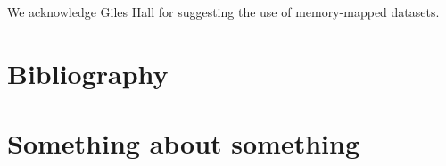 \documentclass[times, twoside, watermark]{StyleBioRxiv}
\begin{document}
\begin{acknowledgements}
We acknowledge Giles Hall for suggesting the use of memory-mapped datasets.
\end{acknowledgements}

\section*{Bibliography}




\captionsetup*{format=largeformat}
\section{Something about something} \label{note:Note1} 

\end{document}
